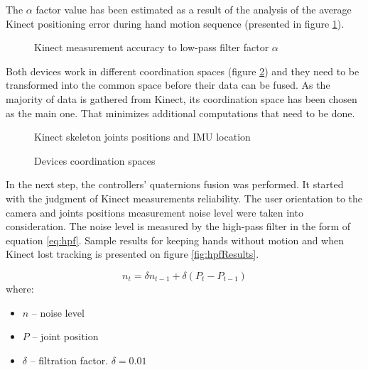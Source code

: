 \documentclass[9pt]{llncs}
\begin{document}
The $\alpha$ factor value has been estimated as a result of the analysis of the average Kinect positioning error during hand motion sequence (presented in figure \ref{fig:lowPass}).

\begin{figure}[!htb]
	\vspace{2.5cm}
	\caption{Kinect measurement accuracy to low-pass filter factor $\alpha$}
	\label{fig:lowPass}
\end{figure}

Both devices work in different coordination spaces (figure \ref{fig:coordinationSpaces}) and they need to be transformed into the common space before their data can be fused. As the majority of data is gathered from Kinect, its coordination space has been chosen as the main one. That minimizes additional computations that need to be done.

\begin{figure}[!htb]
	\begin{minipage}[b]{0.45\linewidth}
		
		\vspace{2.5cm}
		\caption{Kinect skeleton joints positions and IMU location}
		\label{fig:skeleton}
	\end{minipage}
	\begin{minipage}[b]{0.45\linewidth}
		\subfigure[Kinect]
		{
			\vspace{2.5cm}
			\label{fig:kinectCoordinationSpace}
		}
		\subfigure[IMU]
		{
			\vspace{2.5cm}
			\label{fig:imuCoordinationSpace}
		}
		\caption{Devices coordination spaces}
		\label{fig:coordinationSpaces}
	\end{minipage}
\end{figure}

In the next step, the controllers' quaternions fusion was performed. It started with the judgment of Kinect measurements reliability. The user orientation to the camera and joints positions measurement noise level were taken into consideration. The noise level is measured by the high-pass filter in the form of equation \ref{eq:hpf}. Sample results for keeping hands without motion and when Kinect lost tracking is presented on figure \ref{fig:hpfResults}.

\begin{equation}
	\label{eq:hpf}
	n_t = \delta n_{t-1} + \delta(P_t - P_{t-1}) 
\end{equation}\cite{HPFWiki}
where:
\begin{itemize}
	\item $n$ -- noise level
	\item $P$ -- joint position
	\item $\delta$ -- filtration factor. $\delta = 0.01$
\end{itemize}
\end{document}
